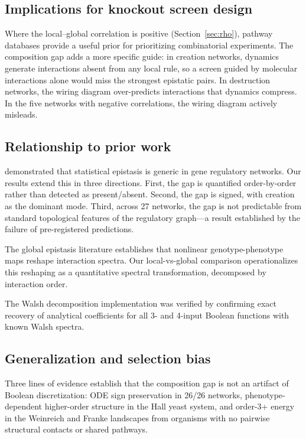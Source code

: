\documentclass[10pt]{article}
\begin{document}
\subsection{Implications for knockout screen design}

Where the local--global correlation is positive
(Section~\ref{sec:rho}), pathway databases provide a useful prior
for prioritizing combinatorial experiments. The composition gap
adds a more specific guide: in creation networks, dynamics generate
interactions absent from any local rule, so a screen guided by
molecular interactions alone would miss the strongest epistatic
pairs. In destruction networks, the wiring diagram over-predicts
interactions that dynamics compress. In the five networks with
negative correlations, the wiring diagram actively misleads.

\subsection{Relationship to prior work}

\citet{gjuvsland2007statistical} demonstrated that
statistical epistasis is generic in gene regulatory networks. Our
results extend this in three directions. First, the gap is quantified
order-by-order rather than detected as present/absent. Second, the
gap is signed, with creation as the dominant mode. Third, across 27
networks, the gap is not predictable from standard topological
features of the regulatory graph---a result established by the
failure of pre-registered predictions.

The global epistasis literature \citep{otwinowski2018inferring, reddy2021global} establishes that nonlinear genotype-phenotype maps
reshape interaction spectra. Our local-vs-global comparison
operationalizes this reshaping as a quantitative spectral
transformation, decomposed by interaction order.

The Walsh decomposition implementation was verified by confirming
exact recovery of analytical coefficients for all 3- and 4-input
Boolean functions with known Walsh spectra.


\subsection{Generalization and selection bias}

Three lines of evidence establish that the composition gap is not an
artifact of Boolean discretization: ODE sign preservation in 26/26
networks, phenotype-dependent higher-order structure in the Hall
yeast system, and order-3+ energy in the Weinreich and Franke
landscapes from organisms with no pairwise structural contacts or
shared pathways.
\end{document}
